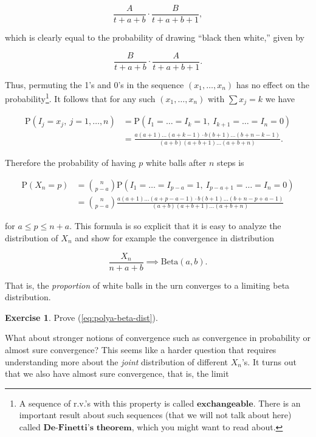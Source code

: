 \documentclass[11pt]{report}
\theoremstyle{plain}
\theoremstyle{definition}
\newtheorem{xexercise}[thm]{Exercise}
\begin{document}
\[
\frac{A}{t+a+b}\cdot \frac{B}{t+a+b+1},
\]

which is clearly equal to the probability of drawing ``black then white,'' given by

\[
\frac{B}{t+a+b}\cdot \frac{A}{t+a+b+1}.
\]

Thus, permuting the 1's and 0's in the sequence $(x_1,\ldots,x_n)$ has no effect on the probability\footnote{A sequence of r.v.'s with this property is called $\textbf{exchangeable}$. There is an important result about such sequences (that we will not talk about here) called $\textbf{De-Finetti's theorem}$, which you might want to read about.}. It follows that for any such $(x_1,\ldots,x_n)$ with $\sum x_j=k$ we have

\begin{align*}
\mathrm{P}(I_j = x_j,\ j=1,\ldots,n) &= \mathrm{P}(I_1=\ldots=I_k=1,\ I_{k+1}=\ldots=I_n=0) \\
&=
\tag{2}\label{eq:polyaurn-formula}
\frac{a(a+1)\ldots(a+k-1)\cdot b(b+1)\ldots(b+n-k-1)}{(a+b)(a+b+1)\ldots(a+b+n)}.
\end{align*}

Therefore the probability of having $p$ white balls after $n$ steps is

\begin{align*}
\mathrm{P}(X_n = p) &= \binom{n}{p-a}
\mathrm{P}(I_1=\ldots=I_{p-a}=1,\ I_{p-a+1}=\ldots=I_n=0) \\
&=
\binom{n}{p-a}
\frac{a(a+1)\ldots(a+p-a-1)\cdot b(b+1)\ldots(b+n-p+a-1)}{(a+b)(a+b+1)\ldots(a+b+n)}
\end{align*}

for $a \le p \le n+a$. This formula is so explicit that it is easy to analyze the distribution of $X_n$ and show for example the convergence in distribution

\begin{equation*} \tag{3}\label{eq:polya-beta-dist}
\frac{X_n}{n+a+b} \implies \textrm{Beta}(a,b).
\end{equation*}

That is, the \emph{proportion} of white balls in the urn converges to a limiting beta distribution.

\begin{xexercise}
Prove (\ref{eq:polya-beta-dist}).
\end{xexercise}

What about stronger notions of convergence such as convergence in probability or almost sure convergence? This seems like a harder question that requires understanding more about the \emph{joint} distribution of different $X_n$'s. It turns out that we also have almost sure convergence, that is, the limit
\end{document}
